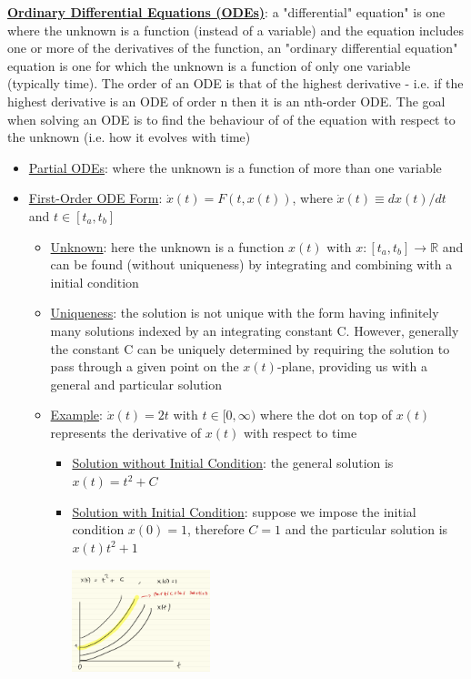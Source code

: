 \documentclass{article}
\begin{document}
\vspace{2.5mm}
\par \underline{\bf{Ordinary Differential Equations (ODEs)}}: a "differential" equation" is one where the unknown is a function (instead of a variable) and the equation includes one or more of the derivatives of the function, an "ordinary differential equation" equation is one for which the unknown is a function of only one variable (typically time). The order of an ODE is that of the highest derivative - i.e. if the highest derivative is an ODE of order n then it is an nth-order ODE. The goal when solving an ODE is to find the behaviour of of the equation with respect to the unknown (i.e. how it evolves with time)
\begin{itemize}
    \item \underline{Partial ODEs}: where the unknown is a function of more than one variable
    \item  \underline{First-Order ODE Form}: $\dot{x}(t) = F(t, x(t))$, where $\dot{x}(t) \equiv dx(t)/dt$ and $t \in [t_{a}, t_{b}]$
    \begin{itemize}
        \item \underline{Unknown}: here the unknown is a function $x(t)$ with $x: [t_{a}, t_{b}] \rightarrow \mathbb{R}$ and can be found (without uniqueness) by integrating and combining with a initial condition
        \item  \underline{Uniqueness}: the solution is not unique with the form having infinitely many solutions indexed by an integrating constant C. However, generally the constant C can be uniquely determined by requiring the solution to pass through a given point on the $x(t)$-plane, providing us with a general and particular solution
        \item  \underline{Example}: $\dot{x}(t) = 2t$ with $t \in [0,\infty)$ where the dot on top of $x(t)$ represents the derivative of $x(t)$ with respect to time
        \begin{itemize}
            \item \underline{Solution without Initial Condition}: the general solution is $x(t) = t^{2} + C$
            \item  \underline{Solution with Initial Condition}: suppose we impose the initial condition $x(0) = 1$, therefore $C=1$ and the particular solution is $x(t) t^{2} + 1$
            \newline
            \begin{center}
            \includegraphics[width=4cm, height=3cm]{pic5}

\end{center}
\end{itemize}
\end{itemize}
\end{itemize}
\end{document}
